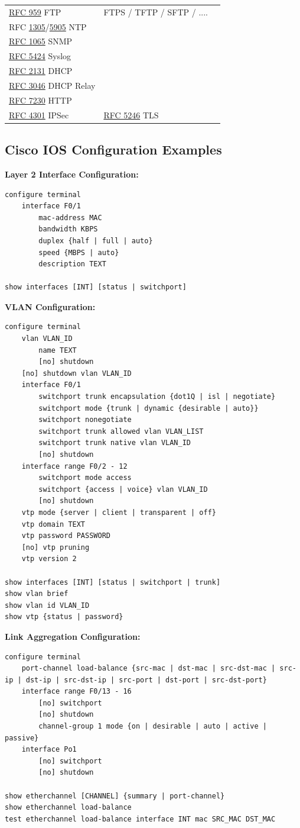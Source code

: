 \documentclass[12pt]{article}
\newcommand{\rfc}[1]{\href{https://datatracker.ietf.org/doc/html/rfc#1}{#1}}
\newcommand{\RFC}[1]{\href{https://datatracker.ietf.org/doc/html/rfc#1}{RFC #1}}
\begin{document}
\begin{table}[H]
\begin{tabular}{llr}
	\RFC{959} FTP			& FTPS / TFTP / SFTP / ....	& \Cref{subsec:FTP}\\
	RFC \rfc{1305}/\rfc{5905} NTP	&					&\\
	\RFC{1065} SNMP			&					&\\
	\RFC{5424} Syslog			&					& \Cref{subsec:SYSLOG}\\
	\RFC{2131} DHCP			&					& \Cref{subsec:DHCP}\\
	\RFC{3046} DHCP Relay		&					& \Cref{subsec:DHCP}\\
	\RFC{7230} HTTP			&					& \Cref{subsec:HTTP}\\
	\RFC{4301} IPSec			& \RFC{5246} TLS			&\\\hline
	\end{tabular}\end{table}


	\newpage
	\subsection{Cisco IOS Configuration Examples \label{subsec:CONFIG}}
	\textbf{Layer 2 Interface Configuration:}
	\begin{lstlisting}
configure terminal
	interface F0/1
		mac-address MAC
		bandwidth KBPS
		duplex {half | full | auto}
		speed {MBPS | auto}
		description TEXT

show interfaces [INT] [status | switchport]
	\end{lstlisting}

	\textbf{VLAN Configuration:}
	\begin{lstlisting}
configure terminal
	vlan VLAN_ID
		name TEXT
		[no] shutdown
	[no] shutdown vlan VLAN_ID
	interface F0/1
		switchport trunk encapsulation {dot1Q | isl | negotiate}
		switchport mode {trunk | dynamic {desirable | auto}}
		switchport nonegotiate
		switchport trunk allowed vlan VLAN_LIST
		switchport trunk native vlan VLAN_ID
		[no] shutdown
	interface range F0/2 - 12
		switchport mode access
		switchport {access | voice} vlan VLAN_ID
		[no] shutdown
	vtp mode {server | client | transparent | off}
	vtp domain TEXT
	vtp password PASSWORD
	[no] vtp pruning
	vtp version 2

show interfaces [INT] [status | switchport | trunk]
show vlan brief
show vlan id VLAN_ID
show vtp {status | password}
	\end{lstlisting}

	\textbf{Link Aggregation Configuration:}
	\begin{lstlisting}
configure terminal
	port-channel load-balance {src-mac | dst-mac | src-dst-mac | src-ip | dst-ip | src-dst-ip | src-port | dst-port | src-dst-port}
	interface range F0/13 - 16
		[no] switchport
		[no] shutdown
		channel-group 1 mode {on | desirable | auto | active | passive}
	interface Po1
		[no] switchport
		[no] shutdown

show etherchannel [CHANNEL] {summary | port-channel}
show etherchannel load-balance
test etherchannel load-balance interface INT mac SRC_MAC DST_MAC
	\end{lstlisting}
\end{document}
